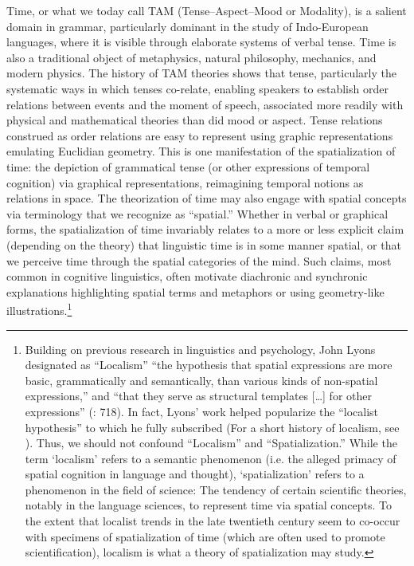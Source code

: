 \documentclass[output=paper]{langsci/langscibook}
\begin{document}
Time, or what we today call TAM (Tense–Aspect–Mood or Modality), is a salient domain in grammar, particularly dominant in the study of Indo-European languages, where it is visible through elaborate systems of verbal tense. Time is also a traditional object of metaphysics, natural philosophy, mechanics, and modern physics. The history of TAM theories shows that tense, particularly the systematic ways in which tenses co-relate, enabling speakers to establish order relations between events and the moment of speech, associated more readily with physical and mathematical theories than did mood or aspect. Tense relations construed as order relations are easy to represent using graphic representations emulating Euclidian geometry. This is one manifestation of the spatialization of time: the depiction of grammatical tense (or other expressions of temporal cognition) via graphical representations, reimagining temporal notions as relations in space. The theorization of time may also engage with spatial concepts via terminology that we recognize as “spatial.” Whether in verbal or graphical forms, the spatialization of time invariably relates to a more or less explicit claim (depending on the theory) that linguistic time is in some manner spatial, or that we perceive time through the spatial categories of the mind. Such claims, most common in cognitive linguistics, often motivate diachronic and synchronic explanations highlighting spatial terms and metaphors or using geometry\nobreakdash-like illustrations.\footnote{Building on previous research in linguistics and psychology, John Lyons designated as “Localism” “the hypothesis that spatial expressions are more basic, grammatically and semantically, than various kinds of non-spatial expressions,” and “that they serve as structural templates […] for other expressions” (\citeyear{lyons_semantics_1977}: 718). In fact, Lyons’ work helped popularize the “localist hypothesis” to which he fully subscribed (For a short history of localism, see \citealt{bohm_andersons_2018}). Thus, we should not confound “Localism” and “Spatialization.” While the term ‘localism’ refers to a semantic phenomenon (i.e. the alleged primacy of spatial cognition in language and thought), ‘spatialization’ refers to a phenomenon in the field of science: The tendency of certain scientific theories, notably in the language sciences, to represent time via spatial concepts. To the extent that localist trends in the late twentieth century seem to co-occur with specimens of spatialization of time (which are often used to promote scientification), localism is what a theory of spatialization may study.}
\end{document}
